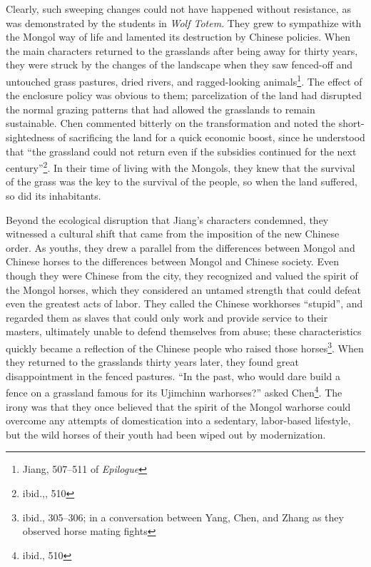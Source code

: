 Clearly, such sweeping changes could not have happened without resistance, as
was demonstrated by the students in \textit{Wolf Totem}. They grew to sympathize
with the Mongol way of life and lamented its destruction by Chinese policies.
When the main characters returned to the grasslands after being away for thirty
years, they were struck by the changes of the landscape when they saw fenced-off
and untouched grass pastures, dried rivers, and ragged-looking
animals\footnote{Jiang, 507--511 of \textit{Epilogue}}.  The effect of the
enclosure policy was obvious to them; parcelization of the land had disrupted
the normal grazing patterns that had allowed the grasslands to remain
sustainable. Chen commented bitterly on the transformation and noted the
short-sightedness of sacrificing the land for a quick economic boost, since he
understood that ``the grassland could not return even if the subsidies continued
for the next century''\footnote{ibid.,, 510}. In their time  of living with the
Mongols, they knew that the survival of the grass was the key to the survival of
the people, so when the land suffered, so did its inhabitants.

Beyond the ecological disruption that Jiang's characters condemned, they
witnessed a cultural shift that came from the imposition of the new Chinese
order. As youths, they drew a parallel from the differences between Mongol and
Chinese horses to the differences between Mongol and Chinese society. Even
though they were Chinese from the city, they recognized and valued the spirit of
the Mongol horses, which they considered an untamed strength that could defeat
even the greatest acts of labor. They called the Chinese workhorses ``stupid'',
and regarded them as slaves that could only work and provide service to their
masters, ultimately unable to defend themselves from abuse; these
characteristics quickly became a reflection of the Chinese people who raised
those horses\footnote{ibid., 305--306; in a conversation between Yang, Chen, and
Zhang as they observed horse mating fights}. When they returned to the
grasslands thirty years later, they found great disappointment in the fenced
pastures. ``In the past, who would dare build a fence on a grassland famous for
its Ujimchinn warhorses?'' asked Chen\footnote{ibid., 510}. The irony was that
they once believed that the spirit of the Mongol warhorse could overcome any
attempts of domestication into a sedentary, labor-based lifestyle, but the wild
horses of their youth had been wiped out by modernization.


